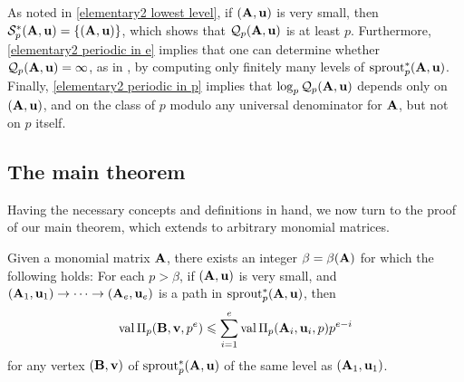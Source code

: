 \documentclass{amsart}
\begin{document}
As noted in \eqref{elementary2 lowest level}, if $(\mathbf{A},\mathbf{u})$ is very small, then $\mathcal{S}^{\ast}_p(\mathbf{A},\mathbf{u}) = \{ (\mathbf{A},\mathbf{u} )\}$, which shows that $\mathcal{Q}_p(\mathbf{A},\mathbf{u})$ is at least $p$.
Furthermore, \eqref{elementary2 periodic in e} implies that one can determine whether $\mathcal{Q}_p(\mathbf{A},\mathbf{u}) = \infty$, as in , by computing only finitely many levels of $\operatorname{sprout}_p^*(\mathbf{A},\mathbf{u})$.
Finally, \eqref{elementary2 periodic in p} implies that $\log_p \mathcal{Q}_p(\mathbf{A},\mathbf{u})$ depends only on $(\mathbf{A},\mathbf{u})$, and on the class of $p$ modulo any universal denominator for $\mathbf{A}$, but not on $p$ itself.

\subsection{The main theorem}

Having the necessary concepts and definitions in hand, we now turn to the proof of our main theorem, which extends  to arbitrary monomial matrices.

\begin{lemma}\label{lem: upper bound for higher mu}
   Given a monomial matrix $\mathbf{A}$, there exists an integer $\beta= \beta(\mathbf{A})$ for which the following holds\textup:
   For each $p>\beta$, if $(\mathbf{A}, \mathbf{u})$ is very small, and $(\mathbf{A}_1, \mathbf{u}_1) \to \cdots \to (\mathbf{A}_e, \mathbf{u}_e)$ is a path in $\operatorname{sprout}^{\ast}_p(\mathbf{A},\mathbf{u})$,  then
   \[
      \operatorname{val} \Pi_p(\mathbf{B}, \mathbf{v}, p^e) \leqslant \sum_{i=1}^e \operatorname{val} \Pi_p(\mathbf{A}_i, \mathbf{u}_i, p)p^{e-i}
   \]
   for any vertex $(\mathbf{B}, \mathbf{v})$ of $\operatorname{sprout}^{\ast}_p(\mathbf{A},\mathbf{u})$ of the same level as $(\mathbf{A}_1, \mathbf{u}_1)$.
\end{lemma}
\end{document}
